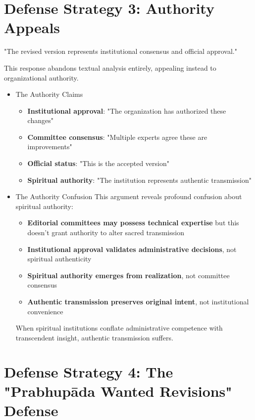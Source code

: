 \documentclass[11pt,twoside]{book}
\begin{document}
\section*{Defense Strategy 3: Authority Appeals}
\label{sec:orgd3fb328}

"The revised version represents institutional consensus and official approval."

This response abandons textual analysis entirely, appealing instead to organizational authority.
\begin{itemize}
\item The Authority Claims
\label{sec:orgb991112}
\begin{itemize}
\item \textbf{\textbf{Institutional approval}}: "The organization has authorized these changes"
\item \textbf{\textbf{Committee consensus}}: "Multiple experts agree these are improvements"
\item \textbf{\textbf{Official status}}: "This is the accepted version"
\item \textbf{\textbf{Spiritual authority}}: "The institution represents authentic transmission"
\end{itemize}
\item The Authority Confusion
\label{sec:org46e40bd}
This argument reveals profound confusion about spiritual authority:
\begin{itemize}
\item \textbf{\textbf{Editorial committees may possess technical expertise}} but this doesn't grant authority to alter sacred transmission
\item \textbf{\textbf{Institutional approval validates administrative decisions}}, not spiritual authenticity
\item \textbf{\textbf{Spiritual authority emerges from realization}}, not committee consensus
\item \textbf{\textbf{Authentic transmission preserves original intent}}, not institutional convenience
\end{itemize}

When spiritual institutions conflate administrative competence with transcendent insight, authentic transmission suffers.
\end{itemize}
\section*{Defense Strategy 4: The "Prabhupāda Wanted Revisions" Defense}
\label{sec:orgcf7d137}
\end{document}
